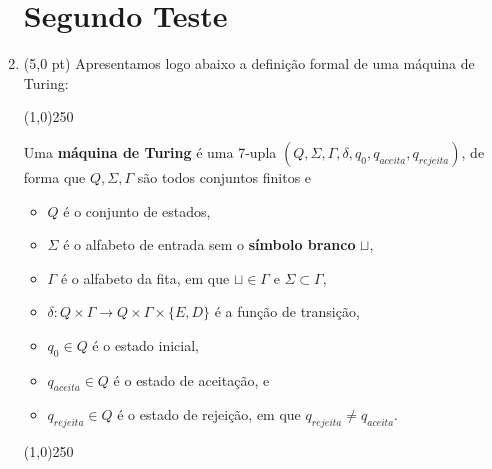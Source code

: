 \documentclass[12pt,a4paper,oneside]{article}
\begin{document}
\begin{enumerate}
	
	\section*{Segundo Teste}
	
	\item (5,0 pt) Apresentamos logo abaixo a definição formal de uma máquina de Turing:
	
	\begin{center}
	\line(1,0){250}
	\end{center}	
	
	Uma {\bf máquina de Turing} é uma 7-upla $(Q, \Sigma, \Gamma, \delta, q_0, q_{aceita}, q_{rejeita})$, de forma que $Q, \Sigma, \Gamma$ são todos conjuntos finitos e
	
		\begin{itemize}
			\item $Q$ é o conjunto de estados,
			\item $\Sigma$ é o alfabeto de entrada sem o {\bf símbolo branco} $\sqcup$,
			\item $\Gamma$ é o alfabeto da fita, em que $\sqcup \in \Gamma$ e $\Sigma \subset \Gamma$,
			\item $\delta : Q \times \Gamma \rightarrow Q \times \Gamma \times \{E, D\}$ é a função de transição,
			\item $q_0 \in Q$ é o estado inicial,
			\item $q_{aceita} \in Q$ é o estado de aceitação, e
			\item $q_{rejeita} \in Q$ é o estado de rejeição, em que $q_{rejeita} \not= q_{aceita}$.
		\end{itemize}
		
	\begin{center}
	\line(1,0){250}
	\end{center}		
		

\end{enumerate}
\end{document}

